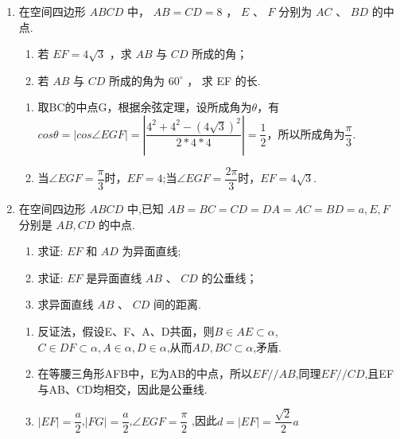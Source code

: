 \begin{enumerate}
\item 在空间四边形 ${ABCD}$ 中， ${AB} = {CD} = 8$ ， $E$ 、 $F$ 分别为 ${AC}$ 、 ${BD}$ 的中点.

\begin{enumerate}
    \item 若 ${EF} = {4\sqrt{3}}$ ，求 ${AB}$ 与 ${CD}$ 所成的角；
    \item 若 ${AB}$ 与 ${CD}$ 所成的角为 ${60}^{ \circ  }$ ， 求 EF 的长.
\end{enumerate}

\begin{jieda}
    \begin{enumerate}
        \item 取BC的中点G，根据余弦定理，设所成角为$\theta$，有$cos\theta=|cos\angle{EGF}|=|\dfrac{4^2+4^2-(4\sqrt{3})^2}{2*4*4}|=\dfrac{1}{2}$，所以所成角为$\dfrac{\pi}{3}$.
        \item 当$\angle{EGF=\dfrac{\pi}{3}}$时，$EF=4$;当$\angle{EGF=\dfrac{2\pi}{3}}$时，$EF=4\sqrt{3}$.
    \end{enumerate}
\end{jieda}

\item 在空间四边形 ${ABCD}$ 中,已知 ${AB} = {BC} = {CD} = {DA} = {AC} = {BD} = a,E,F$ 分别是 ${AB},{CD}$ 的中点. 
\begin{enumerate}
    \item 求证: ${EF}$ 和 ${AD}$ 为异面直线;
    \item 求证: ${EF}$ 是异面直线 ${AB}$ 、 ${CD}$ 的公垂线；
    \item 求异面直线 ${AB}$ 、 ${CD}$ 间的距离.
\end{enumerate}

\begin{jieda}
    \begin{enumerate}
        \item 反证法，假设E、F、A、D共面，则$B\in AE\subset \alpha$,$C\in DF\subset \alpha, A\in \alpha, D\in \alpha$,从而$AD,BC\subset \alpha$,矛盾.
        \item 在等腰三角形AFB中，E为AB的中点，所以$EF// AB$,同理$EF// CD$,且EF与AB、CD均相交，因此是公垂线.

        \item $|EF|=\dfrac{a}{2}$,$|FG|=\dfrac{a}{2}$,$\angle{EGF}=\dfrac{\pi}{2}$ ,因此$d=|EF|=\dfrac{\sqrt{2}}{2}a$
    \end{enumerate}
\end{jieda}




\end{enumerate}
